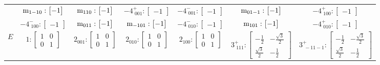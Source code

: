 \documentclass[fleqn,8pt,landscape]{jsarticle}
\begin{document}
\begin{longtable}{ccccccc}
& $ {\rm m}_{1-10}:\begin{bmatrix} -1 \end{bmatrix} $ & $ {\rm m}_{110}:\begin{bmatrix} -1 \end{bmatrix} $ & $ -4^{+}_{\,\,001}:\begin{bmatrix} -1 \end{bmatrix} $ & $ -4^{-}_{\,\,001}:\begin{bmatrix} -1 \end{bmatrix} $ & $ {\rm m}_{01-1}:\begin{bmatrix} -1 \end{bmatrix} $ & $ -4^{+}_{\,\,100}:\begin{bmatrix} -1 \end{bmatrix} $ \\
& $ -4^{-}_{\,\,100}:\begin{bmatrix} -1 \end{bmatrix} $ & $ {\rm m}_{011}:\begin{bmatrix} -1 \end{bmatrix} $ & $ {\rm m}_{-101}:\begin{bmatrix} -1 \end{bmatrix} $ & $ -4^{-}_{\,\,010}:\begin{bmatrix} -1 \end{bmatrix} $ & $ {\rm m}_{101}:\begin{bmatrix} -1 \end{bmatrix} $ & $ -4^{+}_{\,\,010}:\begin{bmatrix} -1 \end{bmatrix} $ \\ \hline
$ E $ & $ 1:\begin{bmatrix} 1 & 0 \\ 0 & 1 \end{bmatrix} $ & $ 2{}_{001}:\begin{bmatrix} 1 & 0 \\ 0 & 1 \end{bmatrix} $ & $ 2{}_{010}:\begin{bmatrix} 1 & 0 \\ 0 & 1 \end{bmatrix} $ & $ 2{}_{100}:\begin{bmatrix} 1 & 0 \\ 0 & 1 \end{bmatrix} $ & $ 3^{+}_{\,\,111}:\begin{bmatrix} - \frac{1}{2} & - \frac{\sqrt{3}}{2} \\ \frac{\sqrt{3}}{2} & - \frac{1}{2} \end{bmatrix} $ & $ 3^{+}_{\,\,-11-1}:\begin{bmatrix} - \frac{1}{2} & - \frac{\sqrt{3}}{2} \\ \frac{\sqrt{3}}{2} & - \frac{1}{2} \end{bmatrix} $ \\

\end{longtable}
\end{document}
